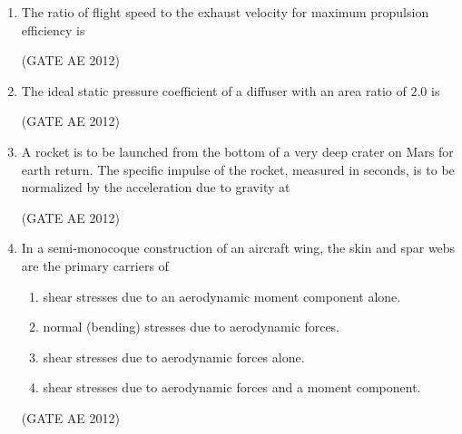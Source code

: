 \documentclass[journal,12pt,onecolumn]{IEEEtran}
\theoremstyle{remark}
\begin{document}
\begin{enumerate}
\item The ratio of flight speed to the exhaust velocity for maximum propulsion efficiency is
\begin{enumerate}
\end{enumerate}
\hfill(GATE AE 2012)



\item The ideal static pressure coefficient of a diffuser with an area ratio of $2.0$ is
\begin{enumerate}
\end{enumerate}
\hfill(GATE AE 2012)



\item A rocket is to be launched from the bottom of a very deep crater on Mars for earth return. The specific impulse of the rocket, measured in seconds, is to be normalized by the acceleration due to gravity at
\begin{enumerate}
\end{enumerate}
\hfill(GATE AE 2012)



\item In a semi-monocoque construction of an aircraft wing, the skin and spar webs are the primary carriers of
\begin{enumerate}
\item shear stresses due to an aerodynamic moment component alone.
\item normal (bending) stresses due to aerodynamic forces.
\item shear stresses due to aerodynamic forces alone.
\item shear stresses due to aerodynamic forces and a moment component.
\end{enumerate}
\hfill(GATE AE 2012)




\end{enumerate}
\end{document}
